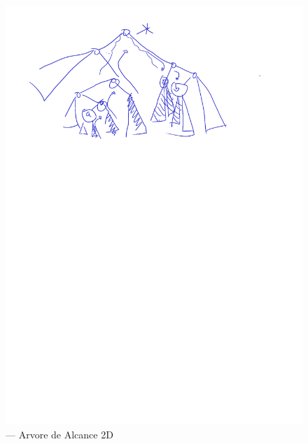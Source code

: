 \begin{figure}[htb]
    \caption{\label{fig:Fig_6} — Arvore de Alcance 2D}
    \begin{center}
        \includegraphics{images/range_tree.pdf}
    \end{center}
\end{figure}


